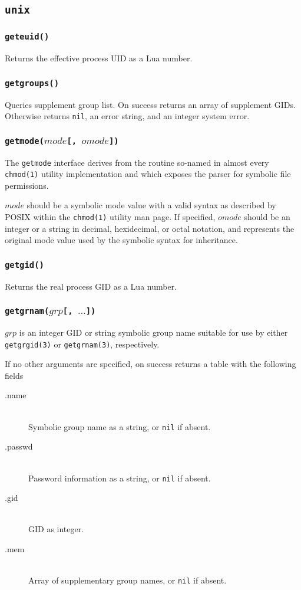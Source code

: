 \documentclass[11pt, oneside]{memoir}
\newcommand*{\nil}[0]{\texttt{nil}\xspace}
\newcommand*{\syscall}[1]{\texttt{#1}\xspace}
\newcommand*{\fn}[1]{\texttt{#1}\xspace}
\newcounter{toccols}
\newenvironment{Module}[1]{
	\subsection{\texttt{#1}}
	\addtocontents{toc}{
		\protect\begin{multicols}{\value{toccols}}
	}
}{
	\addtocontents{toc}{\protect\end{multicols}}
}
\begin{document}
\begin{Module}{unix}
\subsubsection[\fn{geteuid}]{\fn{geteuid()}}

Returns the effective process UID as a Lua number.

\subsubsection[\fn{getgroups}]{\fn{getgroups()}}

Queries supplement group list. On success returns an array of supplement GIDs. Otherwise returns \nil, an error string, and an integer system error.

\subsubsection[\fn{getmode}]{\fn{getmode($mode$[, $omode$])}}

The \fn{getmode} interface derives from the routine so-named in almost every \texttt{chmod(1)} utility implementation and which exposes the parser for symbolic file permissions.

$mode$ should be a symbolic mode value with a valid syntax as described by POSIX within the \syscall{chmod(1)} utility man page. If specified, $omode$ should be an integer or a string in decimal, hexidecimal, or octal notation, and represents the original mode value used by the symbolic syntax for inheritance.

\subsubsection[\fn{getgid}]{\fn{getgid()}}

Returns the real process GID as a Lua number.

\subsubsection[\fn{getgrnam}]{\fn{getgrnam($grp$[, $\ldots$])}}

$grp$ is an integer GID or string symbolic group name suitable for use by either \syscall{getgrgid(3)} or \syscall{getgrnam(3)}, respectively.

If no other arguments are specified, on success returns a table with the following fields

\begin{description}
\item[.name] \hfill \\
Symbolic group name as a string, or \nil if absent.
\item[.passwd] \hfill \\
Password information as a string, or \nil if absent.
\item[.gid] \hfill \\
GID as integer.
\item[.mem] \hfill \\
Array of supplementary group names, or \nil if absent.
\end{description}


\end{Module}
\end{document}
